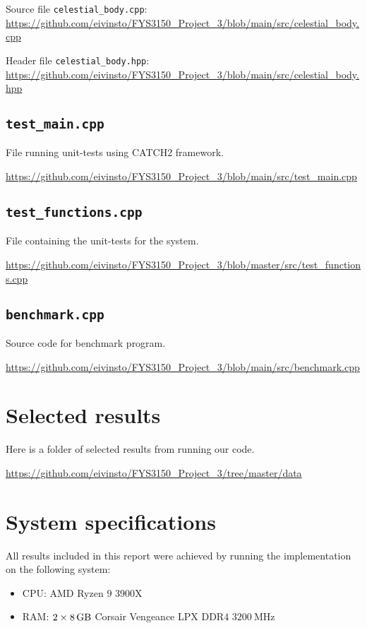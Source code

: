 \documentclass[reprint,english,notitlepage]{revtex4-1}  %
\begin{document}
Source file \verb+celestial_body.cpp+:
\url{https://github.com/eivinsto/FYS3150_Project_3/blob/main/src/celestial_body.cpp}

Header file \verb+celestial_body.hpp+:
\url{https://github.com/eivinsto/FYS3150_Project_3/blob/main/src/celestial_body.hpp}

\cprotect\subsection{\verb+test_main.cpp+} \label{A.6}
File running unit-tests using CATCH2 framework.

\url{https://github.com/eivinsto/FYS3150_Project_3/blob/main/src/test_main.cpp}

\cprotect\subsection{\verb+test_functions.cpp+} \label{A.7}
File containing the unit-tests for the system.

\url{https://github.com/eivinsto/FYS3150_Project_3/blob/master/src/test_functions.cpp}

\cprotect\subsection{\verb+benchmark.cpp+} \label{A.8}
Source code for benchmark program.

\url{https://github.com/eivinsto/FYS3150_Project_3/blob/main/src/benchmark.cpp}

\newpage
\section{Selected results} \label{B}
Here is a folder of selected results from running our code.

\url{https://github.com/eivinsto/FYS3150_Project_3/tree/master/data}

\newpage
\section{System specifications} \label{C}
All results included in this report were achieved by running the implementation on the following system:
\begin{itemize}
	\item CPU: AMD Ryzen \(9\) \(3900\)X
	\item RAM: \(2\times\SI{8}{\giga\byte}\) Corsair Vengeance LPX DDR\(4\) \(\SI{3200}{\mega\hertz}\)
\end{itemize}
\end{document}
